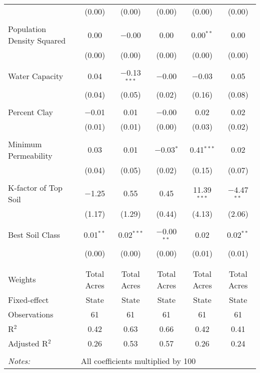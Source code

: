 \documentclass[10pt]{article}
\begin{document}
\begin{table}[!htbp]
\begin{tabular}{@{\extracolsep{5pt}}lccccc}
  & (0.00) & (0.00) & (0.00) & (0.00) & (0.00) \\ 
  & & & & & \\ 
 Population Density Squared & 0.00 & $-$0.00 & 0.00 & 0.00$^{**}$ & 0.00 \\ 
  & (0.00) & (0.00) & (0.00) & (0.00) & (0.00) \\ 
  & & & & & \\ 
 Water Capacity & 0.04 & $-$0.13$^{***}$ & $-$0.00 & $-$0.03 & 0.05 \\ 
  & (0.04) & (0.05) & (0.02) & (0.16) & (0.08) \\ 
  & & & & & \\ 
 Percent Clay & $-$0.01 & 0.01 & $-$0.00 & 0.02 & 0.02 \\ 
  & (0.01) & (0.01) & (0.00) & (0.03) & (0.02) \\ 
  & & & & & \\ 
 Minimum Permeability & 0.03 & 0.01 & $-$0.03$^{*}$ & 0.41$^{***}$ & 0.02 \\ 
  & (0.04) & (0.05) & (0.02) & (0.15) & (0.07) \\ 
  & & & & & \\ 
 K-factor of Top Soil & $-$1.25 & 0.55 & 0.45 & 11.39$^{***}$ & $-$4.47$^{**}$ \\ 
  & (1.17) & (1.29) & (0.44) & (4.13) & (2.06) \\ 
  & & & & & \\ 
 Best Soil Class & 0.01$^{**}$ & 0.02$^{***}$ & $-$0.00$^{**}$ & 0.02 & 0.02$^{**}$ \\ 
  & (0.00) & (0.00) & (0.00) & (0.01) & (0.01) \\ 
  & & & & & \\ 
\hline \\[-1.8ex] 
Weights & Total Acres & Total Acres & Total Acres & Total Acres & Total Acres \\ 
Fixed-effect & State & State & State & State & State \\ 
Observations & 61 & 61 & 61 & 61 & 61 \\ 
R$^{2}$ & 0.42 & 0.63 & 0.66 & 0.42 & 0.41 \\ 
Adjusted R$^{2}$ & 0.26 & 0.53 & 0.57 & 0.26 & 0.24 \\ 
\hline 
\hline \\[-1.8ex] 
\textit{Notes:} & \multicolumn{5}{l}{All coefficients multiplied by 100} \\ 
\end{tabular} 
\end{table} 
\newpage
\end{document}
